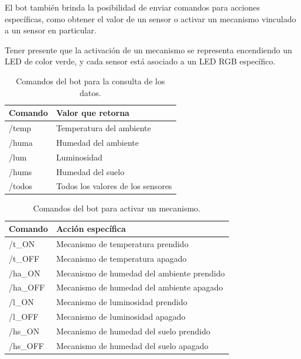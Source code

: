 El bot también brinda la posibilidad de enviar comandos para acciones específicas, como obtener el valor de un sensor o activar un mecanismo vinculado a un sensor en particular.

Tener presente que la activación de un mecanismo se representa encendiendo un LED de color verde, y cada sensor está asociado a un LED RGB específico.
 
\begin{table}[htbp]
\begin{center}
\caption{Comandos del bot para la consulta de los datos.}
\begin{tabular}{|l|l|} %
\hline
\rowcolor[HTML]{C0C0C0} 
\textbf{Comando} & \textbf{Valor que retorna}\\ \hline
/temp & Temperatura del ambiente\\ \hline
/huma& Humedad del ambiente \\ \hline
/lum & Luminosidad\\ \hline
/hums & Humedad del suelo\\ \hline
/todos & Todos los valores de los sensores\\ \hline
\end{tabular}
\end{center}
\end{table}


\begin{table}[htbp]
\begin{center}
\caption{Comandos del bot para activar un mecanismo.}
\begin{tabular}{|l|l|} %
\hline
\rowcolor[HTML]{C0C0C0} 
\textbf{Comando} & \textbf{Acción específica}\\ \hline
/t\_ON & Mecanismo de temperatura prendido\\ \hline
/t\_OFF & Mecanismo de temperatura apagado\\ \hline
/ha\_ON & Mecanismo de humedad del ambiente prendido\\ \hline
/ha\_OFF & Mecanismo de humedad del ambiente apagado\\ \hline
/l\_ON & Mecanismo de luminosidad prendido\\ \hline
/l\_OFF & Mecanismo de luminosidad apagado\\ \hline
/hs\_ON & Mecanismo de humedad del suelo prendido\\ \hline
/hs\_OFF & Mecanismo de humedad del suelo apagado\\ \hline
\end{tabular}
\end{center}
\end{table}

